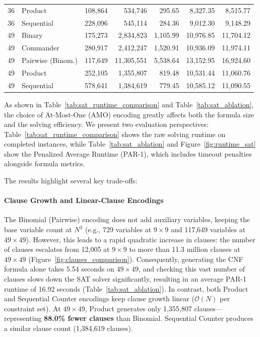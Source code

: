 \documentclass[a4paper,fleqn]{cas-sc}
\begin{document}
\begin{table}[t]
{\begin{tabular}{llrrrrr}
36 & Product           & 108,864 & 534,746      & 295.65 & 8,327.35 & 8,515.77 \\
36 & Sequential        & 228,096 & 545,114      & 284.36 & 9,012.30 & 9,148.29 \\
\midrule
49 & Binary            & 175,273 & 2,834,823    & 1,105.99 & 10,976.85 & 11,704.12 \\
49 & Commander         & 280,917 & 2,412,247    & 1,520.91 & 10,936.09 & 11,974.11 \\
49 & Pairwise (Binom.) & 117,649 & 11,305,551   & 5,538.64 & 13,152.95 & 16,924.60 \\
49 & Product           & 252,105 & 1,355,807    & 819.48   & 10,531.44 & 11,060.76 \\
49 & Sequential        & 578,641 & 1,384,619    & 779.45   & 10,585.12 & 11,090.55 \\
\bottomrule
\end{tabular}%
}
\end{table}

As shown in Table~\ref{tab:sat_runtime_comparison} and Table~\ref{tab:sat_ablation}, the choice of At-Most-One (AMO) encoding greatly affects both the formula size and the solving efficiency. We present two evaluation perspectives: Table~\ref{tab:sat_runtime_comparison} shows the raw solving runtime on completed instances, while Table~\ref{tab:sat_ablation} and Figure~\ref{fig:runtime_sat} show the Penalized Average Runtime (PAR-1), which includes timeout penalties alongside formula metrics.

The results highlight several key trade-offs:

\paragraph{Clause Growth and Linear-Clause Encodings}
The Binomial (Pairwise) encoding does not add auxiliary variables, keeping the base variable count at $N^3$ (e.g., 729 variables at $9 \times 9$ and 117,649 variables at $49 \times 49$). However, this leads to a rapid quadratic increase in clauses: the number of clauses escalates from 12,005 at $9 \times 9$ to more than 11.3 million clauses at $49 \times 49$ (Figure~\ref{fig:clauses_comparison}). Consequently, generating the CNF formula alone takes 5.54 seconds on $49 \times 49$, and checking this vast number of clauses slows down the SAT solver significantly, resulting in an average PAR-1 runtime of 16.92 seconds (Table~\ref{tab:sat_ablation}). In contrast, both Product and Sequential Counter encodings keep clause growth linear ($\mathcal{O}(N)$ per constraint set). At $49 \times 49$, Product generates only 1,355,807 clauses---representing \textbf{88.0\% fewer clauses} than Binomial. Sequential Counter produces a similar clause count (1,384,619 clauses).
\end{document}
